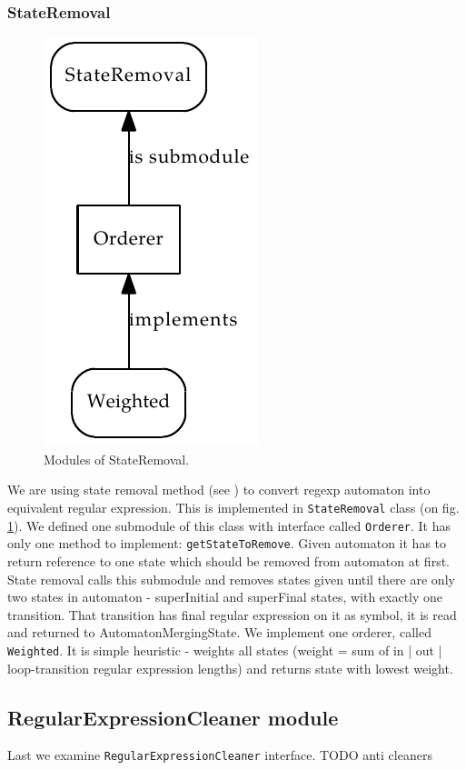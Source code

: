 \documentclass[a4paper,10pt,oneside]{article}
\newcommand{\myscale}{0.74}
\newcommand{\code}[1]{\texttt{#1}}
\begin{document}
\subsubsection{StateRemoval}
\begin{figure}
	\centering\includegraphics[scale=\myscale]{state_removal_modules}
	\caption{Modules of StateRemoval.} \label{state_removal_modules}
\end{figure}
We are using state removal method (see \cite{1224321}) to convert regexp automaton into equivalent regular expression.
This is implemented in \code{StateRemoval} class (on fig. \ref{state_removal_modules}).
We defined one submodule of this class with interface called \code{Orderer}.
It has only one method to implement: \code{getStateToRemove}.
Given automaton it has to return reference to one state which should be removed from automaton at first.
State removal calls this submodule and removes states given until there are only two states in automaton - superInitial and superFinal states,
with exactly one transition.
That transition has final regular expression on it as symbol, it is read and returned to AutomatonMergingState.
We implement one orderer, called \code{Weighted}.
It is simple heuristic - weights all states (weight = sum of {in | out | loop}-transition regular expression lengths) and returns state with lowest weight.

\subsection{RegularExpressionCleaner module}
Last we examine \code{RegularExpressionCleaner} interface.
TODO anti cleaners
\end{document}
